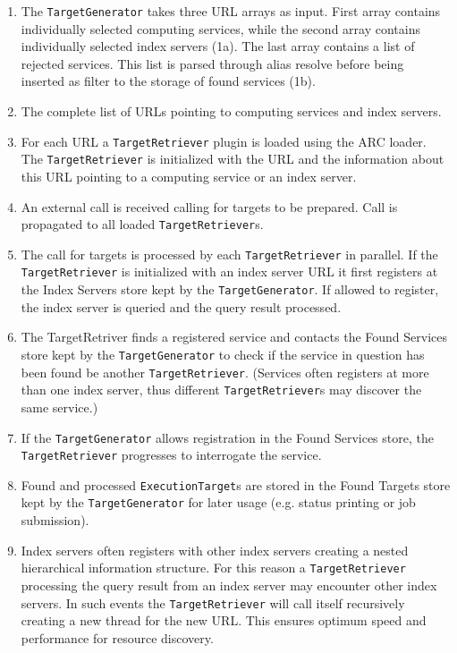 \documentclass{book}
\newcommand{\TargetGenerator}{\texttt{TargetGenerator}}
\newcommand{\TargetRetriever}{\texttt{TargetRetriever}}
\newcommand{\ExecutionTarget}{\texttt{ExecutionTarget}}
\begin{document}
\begin{enumerate}
\item{The {\TargetGenerator} takes three URL arrays as input. First array contains individually selected computing services, while the 
second array contains individually selected index servers (1a). The last array contains a list of rejected services. This 
list is parsed through alias resolve before being inserted as filter to the storage of found services (1b).}
\item{The complete list of URLs pointing to computing services and index servers.}
\item{For each URL a {\TargetRetriever} plugin is loaded using the ARC loader. The {\TargetRetriever} is initialized 
with the URL and the information about this URL pointing to a computing service or an index server.}
\item{An external call is received calling for targets to be prepared. Call is propagated to all loaded {\TargetRetriever}s.}
\item{The call for targets is processed by each {\TargetRetriever} in parallel. If the {\TargetRetriever} is initialized with an 
index server URL it first registers at the Index Servers store kept by the {\TargetGenerator}. If allowed to register, the index 
server is queried and the query result processed.}
\item{The TargetRetriver finds a registered service and contacts the Found Services store kept by the {\TargetGenerator} to check 
if the service in question has been found be another {\TargetRetriever}. (Services often registers at more than one index server, 
thus different {\TargetRetriever}s may discover the same service.)}
\item{If the {\TargetGenerator} allows registration in the Found Services store, the {\TargetRetriever} progresses to interrogate the service.}
\item{Found and processed {\ExecutionTarget}s are stored in the Found Targets store kept by the {\TargetGenerator} for later usage 
(e.g. status printing or job submission).}
\item{Index servers often registers with other index servers creating a nested hierarchical information structure. For this 
reason a {\TargetRetriever} processing the query result from an index server may encounter other index servers. In such
events the {\TargetRetriever} will call itself recursively creating a new thread for the new URL. This ensures optimum speed and 
performance for resource discovery.}
\end{enumerate}
\end{document}
